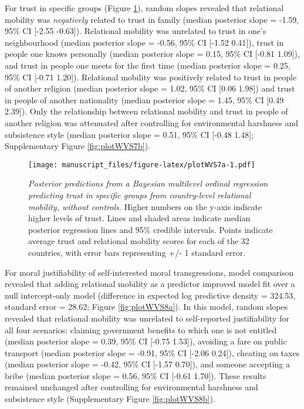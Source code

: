 \documentclass[english,man,floatsintext]{apa6}
\begin{document}
For trust in specific groups (Figure \ref{fig:plotWVS7a}), random slopes revealed that relational mobility was \emph{negatively} related to trust in family (median posterior slope = -1.59, 95\% CI {[}-2.55 -0.63{]}). Relational mobility was unrelated to trust in one's neighbourhood (median posterior slope = -0.56, 95\% CI {[}-1.52 0.41{]}), trust in people one knows personally (median posterior slope = 0.15, 95\% CI {[}-0.81 1.09{]}), and trust in people one meets for the first time (median posterior slope = 0.25, 95\% CI {[}-0.71 1.20{]}). Relational mobility was positively related to trust in people of another religion (median posterior slope = 1.02, 95\% CI {[}0.06 1.98{]}) and trust in people of another nationality (median posterior slope = 1.45, 95\% CI {[}0.49 2.39{]}). Only the relationship between relational mobility and trust in people of another religion was attenuated after controlling for environmental harshness and subsistence style (median posterior slope = 0.51, 95\% CI {[}-0.48 1.48{]}; Supplementary Figure \ref{fig:plotWVS7b}).



\begin{figure}
\centering
\texttt{[image: manuscript\_files/figure-latex/plotWVS7a-1.pdf]}
\caption{\label{fig:plotWVS7a}\emph{Posterior predictions from a Bayesian multilevel ordinal regression predicting trust in specific groups from country-level relational mobility, without controls.} Higher numbers on the y-axis indicate higher levels of trust. Lines and shaded areas indicate median posterior regression lines and 95\% credible intervals. Points indicate average trust and relational mobility scores for each of the 32 countries, with error bars representing +/- 1 standard error.}
\end{figure}

For moral justifiability of self-interested moral transgressions, model comparison revealed that adding relational mobility as a predictor improved model fit over a null intercept-only model (difference in expected log predictive density = 324.53, standard error = 28.62; Figure \ref{fig:plotWVS8a}). In this model, random slopes revealed that relational mobility was unrelated to self-reported justifiability for all four scenarios: claiming government benefits to which one is not entitled (median posterior slope = 0.39, 95\% CI {[}-0.75 1.53{]}), avoiding a fare on public transport (median posterior slope = -0.91, 95\% CI {[}-2.06 0.24{]}), cheating on taxes (median posterior slope = -0.42, 95\% CI {[}-1.57 0.70{]}), and someone accepting a bribe (median posterior slope = 0.56, 95\% CI {[}-0.61 1.70{]}). These results remained unchanged after controlling for environmental harshness and subsistence style (Supplementary Figure \ref{fig:plotWVS8b}).
\end{document}
